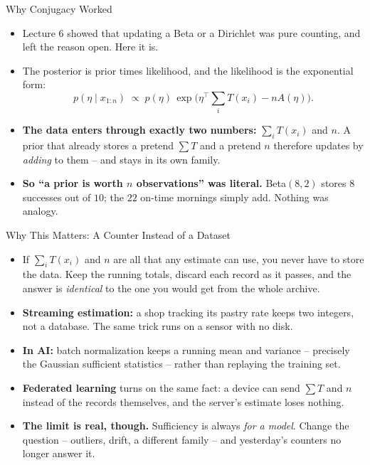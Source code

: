 \begin{frame}{Why Conjugacy Worked}
\begin{itemize}
  \item Lecture 6 showed that updating a Beta or a Dirichlet was pure counting, and left the reason open. Here it is.
  \pause
  \item The posterior is prior times likelihood, and the likelihood is the exponential form:
  \[
    p(\eta \mid x_{1:n}) \;\propto\; p(\eta)\,\exp\Big( \eta^{\top}\textstyle\sum_i T(x_i) - n A(\eta) \Big).
  \]
  \pause
  \item \textbf{The data enters through exactly two numbers:} $\sum_i T(x_i)$ and $n$. A prior that already stores a pretend $\sum T$ and a pretend $n$ therefore updates by \emph{adding} to them -- and stays in its own family.
  \pause
  \item \textbf{So ``a prior is worth $n$ observations'' was literal.} Beta$(8,2)$ stores $8$ successes out of $10$; the $22$ on-time mornings simply add. Nothing was analogy.
\end{itemize}
\end{frame}

\begin{frame}{Why This Matters: A Counter Instead of a Dataset}
\begin{itemize}
  \item If $\sum_i T(x_i)$ and $n$ are all that any estimate can use, you never have to store the data. Keep the running totals, discard each record as it passes, and the answer is \emph{identical} to the one you would get from the whole archive.
  \pause
  \item \textbf{Streaming estimation:} a shop tracking its pastry rate keeps two integers, not a database. The same trick runs on a sensor with no disk.
  \pause
  \item \textbf{In AI:} batch normalization keeps a running mean and variance -- precisely the Gaussian sufficient statistics -- rather than replaying the training set.
  \pause
  \item \textbf{Federated learning} turns on the same fact: a device can send $\sum T$ and $n$ instead of the records themselves, and the server's estimate loses nothing.
  \pause
  \item \textbf{The limit is real, though.} Sufficiency is always \emph{for a model}. Change the question -- outliers, drift, a different family -- and yesterday's counters no longer answer it.
\end{itemize}
\end{frame}

